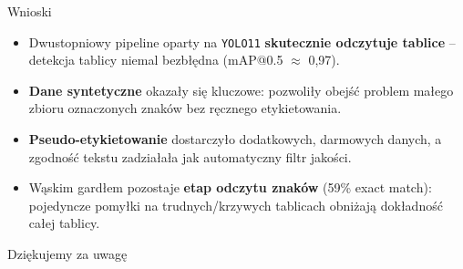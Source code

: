 \documentclass{beamer}
\begin{document}
\begin{frame}{Wnioski}

\begin{itemize}
    \item Dwustopniowy pipeline oparty na \texttt{YOLO11} \textbf{skutecznie odczytuje
    tablice} -- detekcja tablicy niemal bezbłędna (mAP@0.5 $\approx$ 0{,}97).
    \item \textbf{Dane syntetyczne} okazały się kluczowe: pozwoliły obejść problem
    małego zbioru oznaczonych znaków bez ręcznego etykietowania.
    \item \textbf{Pseudo-etykietowanie} dostarczyło dodatkowych, darmowych
    danych, a zgodność tekstu zadziałała jak automatyczny filtr jakości.
    \item Wąskim gardłem pozostaje \textbf{etap odczytu znaków} (59\% exact match):
    pojedyncze pomyłki na trudnych/krzywych tablicach obniżają dokładność całej tablicy.
\end{itemize}

\end{frame}


\begin{frame}
\centering
\vfill
{\Large Dziękujemy za uwagę}
\vfill
\end{frame}
\end{document}
